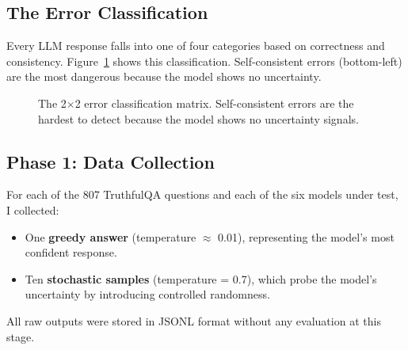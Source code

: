 \documentclass[11pt]{article}
\begin{document}
\subsection{The Error Classification}

Every LLM response falls into one of four categories based on correctness and consistency. Figure~\ref{fig:errormatrix} shows this classification. Self-consistent errors (bottom-left) are the most dangerous because the model shows no uncertainty.

\begin{figure}[H]
\centering
{}
\caption{The 2$\times$2 error classification matrix. Self-consistent errors are the hardest to detect because the model shows no uncertainty signals.}
\label{fig:errormatrix}
\end{figure}

\subsection{Phase 1: Data Collection}

For each of the 807 TruthfulQA questions and each of the six models under test, I collected:
\begin{itemize}
    \item One \textbf{greedy answer} (temperature $\approx$ 0.01), representing the model's most confident response.
    \item Ten \textbf{stochastic samples} (temperature = 0.7), which probe the model's uncertainty by introducing controlled randomness.
\end{itemize}
All raw outputs were stored in JSONL format without any evaluation at this stage.
\end{document}
